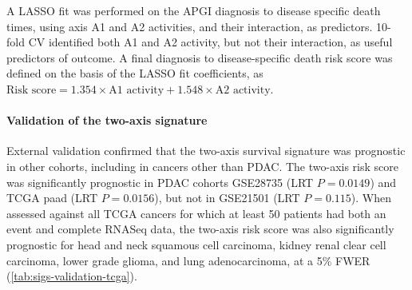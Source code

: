 \documentclass[dissertation.tex]{subfiles}
\begin{document}
A \gls{LASSO} fit was performed on the \gls{APGI} diagnosis to disease specific death times, using axis A1 and A2 activities, and their interaction, as predictors.  10-fold \gls{CV} identified both A1 and A2 activity, but not their interaction, as useful predictors of outcome.  A final diagnosis to disease-specific death risk score was defined on the basis of the \gls{LASSO} fit coefficients, as $\text{Risk score} = 1.354 \times \text{A1 activity} + 1.548 \times \text{A2 activity}$.

\paragraph{Validation of the two-axis signature}
External validation confirmed that the two-axis survival signature was prognostic in other cohorts, including in cancers other than \gls{PDAC}.  The two-axis risk score was significantly prognostic in \gls{PDAC} cohorts GSE28735 \cite{Zhang2013} (LRT $P = 0.0149$) and \gls{TCGA} paad (LRT $P = 0.0156$), but not in GSE21501 \cite{Stratford2010} (LRT $P = 0.115$).  When assessed against all \gls{TCGA} cancers for which at least 50 patients had both an event and complete RNASeq data, the two-axis risk score was also significantly prognostic for head and neck squamous cell carcinoma, kidney renal clear cell carcinoma, lower grade glioma, and lung adenocarcinoma, at a 5\% \gls{FWER} (\cref{tab:sigs-validation-tcga}).
\end{document}
